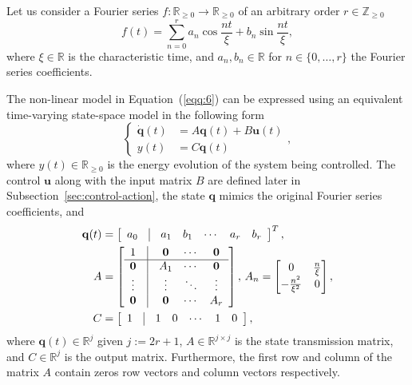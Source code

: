\documentclass[letterpaper,10pt,conference]{ieeeconf}
\begin{document}
Let us consider a Fourier series $f:\mathbb{R}_{\geq 0}\rightarrow\mathbb{R}_{\geq 0}$ of an arbitrary order $r\in\mathbb{Z}_{\geq 0}$
\begin{equation}\label{eqq:6}
  f(t)=\sum_{n=0}^{r}{a_n\cos{\frac{nt}{\xi}}+b_n\sin{\frac{nt}{\xi}}},
\end{equation}
where $\xi\in\mathbb{R}$ is the characteristic time, and $a_n, b_n\in\mathbb{R}$ for $n\in\{0,\dotsc,r\}$ the Fourier series coefficients.

The non-linear model in Equation~(\ref{eqq:6}) can be expressed using an equivalent time-varying state-space model in the following form
\begin{equation}\label{eqq:7}\begin{cases}
  \dot{\mathbf{q}}(t)&=A\mathbf{q}(t)+B\mathbf{u}(t)\\%
  y(t)&=C\mathbf{q}(t)%
\end{cases},\end{equation}
where $y(t)\in\mathbb{R}_{\geq 0}$ is the energy evolution of the system being controlled. The control $\mathbf{u}$ along with the input matrix $B$ are defined later in Subsection~\ref{sec:control-action}, the state $\mathbf{q}$ mimics the original Fourier series coefficients, and
\begin{equation}\label{eqq:8}\begin{split}
  \mathbf{q}(t)&=\left[\begin{array}{ccccccc}
    a_0 & \vline & a_1 & b_1 & \cdots & a_r & b_r
  \end{array}\right]^T,\\
  A&=\left[\begin{array}{ccccc}
    1          & \vline & \mathbf{0} & \cdots & \mathbf{0} \\\hline
    \mathbf{0} & \vline & A_1        & \cdots & \mathbf{0} \\
    \vdots     & \vline & \vdots     & \ddots & \vdots     \\
    \mathbf{0} & \vline & \mathbf{0} & \cdots & A_r 
  \end{array}\right],\,A_n=\begin{bmatrix}0 & \frac{n}{\xi} \\ -\frac{n^2}{\xi^2} & 0\end{bmatrix},\\
  C&=\left[\begin{array}{ccccccc}
    1 & \vline & 1 & 0 & \cdots & 1 & 0
  \end{array}\right],
\end{split}\end{equation}
where $\mathbf{q}(t)\in\mathbb{R}^j$ given $j:=2r+1$, $A\in\mathbb{R}^{j\times j}$ is the state transmission matrix, and $C\in\mathbb{R}^j$ is the output matrix. Furthermore, the first row and column of the matrix $A$ contain zeros row vectors and column vectors respectively.
\end{document}
